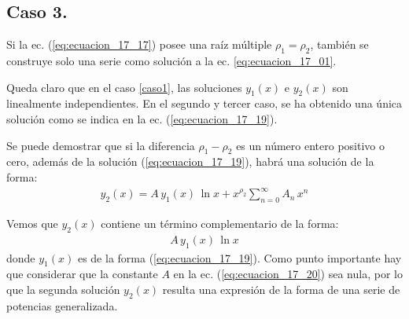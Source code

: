 \subsection{Caso 3.}

Si la ec. (\ref{eq:ecuacion_17_17}) posee una raíz múltiple $\rho_{1} = \rho_{2}$, también se construye solo una serie como solución a la ec. \ref{eq:ecuacion_17_01}.

Queda claro que en el caso \ref{caso1}, las soluciones $y_{1}(x)$ e $y_{2}(x)$ son linealmente independientes. En el segundo y tercer caso, se ha obtenido una única solución como se indica en la ec. (\ref{eq:ecuacion_17_19}).
\par
Se puede demostrar que si la diferencia $\rho_{1} - \rho_{2}$ es un número entero positivo o cero, además de la solución (\ref{eq:ecuacion_17_19}), habrá una solución de la forma:
\begin{align}
y_{2}(x) = A \, y_{1}(x) \, \ln x + x^{\rho_{2}} \sum_{n=0}^{\infty} A_{n} \, x^{n}
\label{eq:ecuacion_17_20}
\end{align}

Vemos que $y_{2}(x)$ contiene un término complementario de la forma:
\begin{align*}
A \, y_{1} (x) \, \ln x
\end{align*}
\noindent
donde $y_{1}(x)$ es de la forma (\ref{eq:ecuacion_17_19}). Como punto importante hay que considerar que la constante $A$ en la ec. (\ref{eq:ecuacion_17_20}) sea nula, por lo que la segunda solución $y_{2}(x)$ resulta una expresión de la forma de una serie de potencias generalizada.


